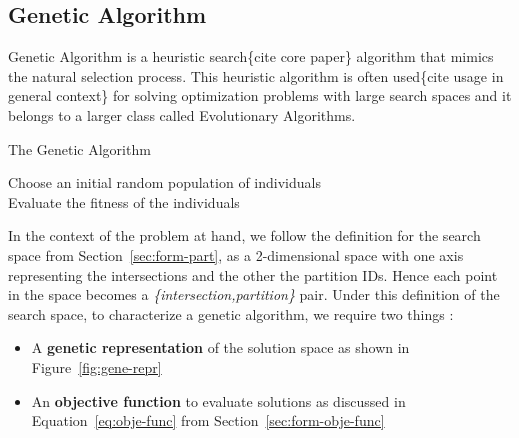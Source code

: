 \subsection{Genetic Algorithm}
\label{sec:gen-algo}

Genetic Algorithm is a heuristic search\{cite core paper\} algorithm that mimics the natural selection process. This heuristic algorithm is often used\{cite usage in general context\} for solving optimization problems with large search spaces and it belongs to a larger class called Evolutionary Algorithms.

\begin{algorithm}[ht!]
    \caption{The Genetic Algorithm}
    \label{algo:ga}
    Choose an initial random population of individuals\\
    Evaluate the fitness of the individuals\\
\end{algorithm}

In the context of the problem at hand, we follow the definition for the search space from Section~\ref{sec:form-part}, as a 2-dimensional space with one axis representing the intersections and the other the partition IDs. Hence each point in the space becomes a \textit{\{intersection,partition\}} pair. Under this definition of the search space, to characterize a genetic algorithm, we require two things :
\begin{itemize}
	\item A \textbf{genetic representation} of the solution space as shown in Figure~\ref{fig:gene-repr}
	\item An \textbf{objective function} to evaluate solutions as discussed in Equation~\ref{eq:obje-func} from Section~\ref{sec:form-obje-func}
\end{itemize}

